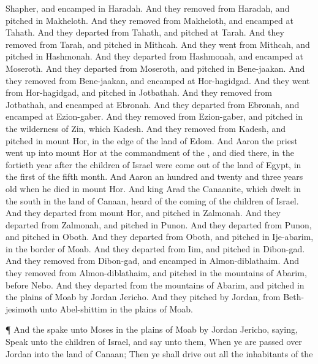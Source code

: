 {Shapher, and
encamped in
Haradah.
And they
removed from
Haradah, and
pitched in
Makheloth.
And they
removed from
Makheloth, and
encamped at
Tahath.
And they
departed from
Tahath, and
pitched at
Tarah.
And they
removed from
Tarah, and
pitched in
Mithcah.
And they
went from
Mithcah, and
pitched in
Hashmonah.
And they
departed from
Hashmonah, and
encamped at
Moseroth.
And they
departed from
Moseroth, and
pitched in
Bene-jaakan.
And they
removed from
Bene-jaakan, and
encamped at
Hor-hagidgad.
And they
went from
Hor-hagidgad, and
pitched in
Jotbathah.
And they
removed from
Jotbathah, and
encamped at
Ebronah.
And they
departed from
Ebronah, and
encamped at
Ezion-gaber.
And they
removed from
Ezion-gaber, and
pitched in the
wilderness of
Zin, which
{}
Kadesh.
And they
removed from
Kadesh, and
pitched in
mount
Hor, in the
edge of the
land of
Edom.
And
Aaron the
priest went
up into
mount
Hor at the
commandment of the
{}, and
died there, in the
fortieth
year after the
children of
Israel were come
out of the
land of
Egypt, in the
first
{} of the
fifth
month.
And
Aaron
{} an
hundred and
twenty and
three
years
old when he
died in
mount
Hor.
And
king
Arad the
Canaanite, which
dwelt in the
south in the
land of
Canaan,
heard of the
coming of the
children of
Israel.
And they
departed from
mount
Hor, and
pitched in
Zalmonah.
And they
departed from
Zalmonah, and
pitched in
Punon.
And they
departed from
Punon, and
pitched in
Oboth.
And they
departed from
Oboth, and
pitched in
Ije-abarim, in the
border of
Moab.
And they
departed from
Iim, and
pitched in
Dibon-gad.
And they
removed from
Dibon-gad, and
encamped in
Almon-diblathaim.
And they
removed from
Almon-diblathaim, and
pitched in the
mountains of
Abarim,
before
Nebo.
And they
departed from the
mountains of
Abarim, and
pitched in the
plains of
Moab by
Jordan
{}
Jericho.
And they
pitched by
Jordan, from
Beth-jesimoth
{} unto
Abel-shittim in the
plains of
Moab.
\par }{\PP {}¶ And the
{}
spake unto
Moses in the
plains of
Moab by
Jordan
{}
Jericho,
saying,
Speak unto the
children of
Israel, and
say unto them, When ye are passed
over
Jordan into the
land of
Canaan;
Then ye shall drive
out all the
inhabitants of the
}
